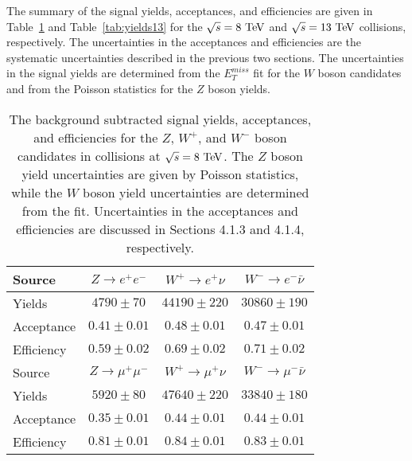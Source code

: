 The summary of the signal yields, acceptances, and efficiencies are given in Table~\ref{tab:yields8} and Table~\ref{tab:yields13} for the $\sqrt{s}=8~\mathrm{Te\kern -0.1em V}$ and $\sqrt{s}=13~\mathrm{Te\kern -0.1em V}$ collisions, respectively. The uncertainties in the acceptances and efficiencies are the systematic uncertainties described in the previous two sections. The uncertainties in the signal yields are determined from the $E_{T}^{miss}$ fit for the $W$ boson candidates and  from the Poisson statistics for the $Z$ boson yields.   
\def\WEMYIELD{98200 \pm 950}
\def\WEPYIELD{122320 \pm 980}
\def\WMMYIELD{131250 \pm 910}
\def\WMPYIELD{167710 \pm 830}
\def\ZEEYIELD{15290 \pm 120}
\def\ZMMYIELD{23670 \pm 150}
\def\WMPACC{0.44 \pm 0.01 }
\def\WMMACC{0.46 \pm 0.01 }
\def\WMACC{0.45 \pm 0.01 }
\def\ZMMACC{0.36 \pm 0.01 }
\def\WMPEFF{0.78 \pm 0.01 }
\def\WMMEFF{0.79 \pm 0.01 }
\def\WMEFF{0.78 \pm 0.01 }
\def\ZMMEFF{0.80 \pm 0.02 }
\def\WEPACC{0.43 \pm 0.01 }
\def\WEMACC{0.44 \pm 0.01 }
\def\WEACC{0.44 \pm 0.01 }
\def\ZEEACC{0.33 \pm 0.01 }
\def\WEPEFF{0.58 \pm 0.01 }
\def\WEMEFF{0.60 \pm 0.01 }
\def\WEEFF{0.59 \pm 0.01 }
\def\ZEEEFF{0.56 \pm 0.01 }
\begin{table*}[thbp]
\centering
\begin {tabular} {lccc}
\hline
Source     &  $Z\rightarrow e^+e^-$  & $W^{+}\rightarrow e^+\nu$           & $W^{-}\rightarrow e^-\bar{\nu}$            \\
\hline
Yields     & $4790\pm70$ & $44190\pm220$ & $30860\pm190$\\
Acceptance&$0.41\pm0.01$&$0.48\pm0.01$&$0.47\pm0.01$\\
Efficiency&$0.59\pm0.02$&$0.69\pm0.02$&$0.71\pm0.02$\\
  \hline
 Source     &  $Z\rightarrow \mu^+\mu^-$  & $W^{+}\rightarrow \mu^+\nu$           & $W^{-}\rightarrow \mu^-\bar{\nu}$            \\
\hline
Yields    &  $5920\pm80$&$47640\pm220$&$33840\pm180$\\
Acceptance &$0.35\pm0.01$&$0.44\pm0.01$&$0.44\pm0.01$\\
Efficiency &$0.81\pm0.01$&$0.84\pm0.01$&$0.83\pm0.01$\\
\hline
\end{tabular}
\caption{ \label{tab:yields8}
The background subtracted signal yields, acceptances, and efficiencies for the $Z$, $W^+$, and $W^-$ boson candidates in collisions at $\sqrt{s}=8~\mathrm{Te\kern -0.1em V}$. The $Z$ boson yield uncertainties are given by Poisson statistics, while the $W$ boson yield uncertainties are determined from the fit. Uncertainties in the acceptances and efficiencies are discussed in Sections 4.1.3 and 4.1.4, respectively.}
\end{table*}
